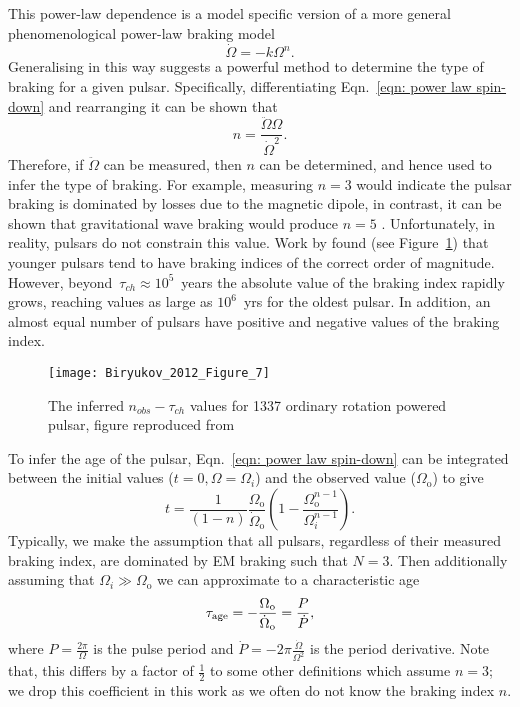 This power-law dependence is a model specific version of a more general
phenomenological power-law braking model
\begin{equation}
    \dot{\Omega} = -k \Omega^{n}.
    \label{eqn: power law spin-down}
\end{equation}
Generalising in this way suggests a powerful method to determine the type of
braking for a given pulsar. Specifically, differentiating Eqn.~\eqref{eqn: power law spin-down}
and rearranging it can be shown that
\begin{equation}
    n = \frac{\ddot{\Omega}\Omega}{\dot{\Omega}^{2}}.
    \label{eqn: measured braking index}
\end{equation}
Therefore, if $\ddot{\Omega}$ can be measured, then $n$ can be determined, and
hence used to infer the type of braking. For example, measuring $n=3$ would
indicate the pulsar braking is dominated by losses due to the magnetic dipole,
in contrast, it can be shown that gravitational wave braking would produce
$n=5$ \citep{Shapiro83}. Unfortunately, in reality, pulsars do not constrain this
value. Work by \citet{Biryukov2012} found (see Figure~\ref{fig: biryukov}) that
younger pulsars tend to have braking indices of the correct order of
magnitude. However, beyond~$\tau_{ch}\approx10^{5}$~years
the absolute value of the braking index rapidly grows,
reaching values as large as $10^{6}$~yrs for the oldest pulsar. In addition, an
almost equal number of pulsars have positive and negative values of the braking
index.
\begin{figure}[htb]
\centering
\texttt{[image: Biryukov\_2012\_Figure\_7]}
\caption{The inferred $n_{obs}-\tau_{ch}$ values for 1337 ordinary rotation
powered pulsar, figure reproduced from \citet{Biryukov2012}}
\label{fig: biryukov}
\end{figure}

To infer the age of the pulsar, Eqn.~\eqref{eqn: power law spin-down} can
be integrated between the initial values ($t=0, \Omega=\Omega_{i}$) and the
observed value ($\Omega_{\mathrm{o}}$) to give
\begin{equation}
    t = \frac{1}{(1-n)} \frac{\Omega_{\mathrm{o}}}{\dot\Omega_{\mathrm{o}}} 
        \left(1 - \frac{\Omega_{\mathrm{o}}^{n-1}}{\Omega_{i}^{n-1}}\right).
\label{eqn: characteristic age}
\end{equation}
Typically, we make the assumption that all
pulsars, regardless of their measured braking index, are dominated by EM braking
such that $N=3$. Then additionally assuming that $\Omega_{i} \gg
\Omega_{\mathrm{o}}$ we can approximate to a characteristic age
\begin{equation}
    \tau_{\mathrm{age}} = -\frac{\Omega_{\mathrm{o}}}{\dot\Omega_{\mathrm{o}}}
         = \frac{P}{\dot{P}},
\label{eqn: tauAge definition}
\end{equation}
where $P=\frac{2\pi}{\Omega}$ is the pulse period and
$\dot{P}=-2\pi\frac{\dot{\Omega}}{\Omega^{2}}$ is the period derivative.  Note
that, this differs by a factor of $\frac{1}{2}$ to some other definitions which
assume $n=3$; we drop this coefficient in this work as we often do not know the
braking index $n$.

